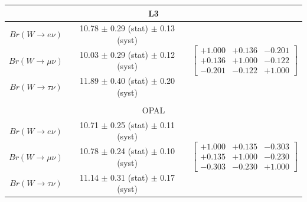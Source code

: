 \begin{table}[ht]
{\begin{tabular}{ |c| c  c | }
         
         \hline
         \multicolumn{3}{|c|}{L3 \cite{Achard:2004zw}} \\
         \hline
         $Br(W\to e    \nu)$    & 10.78 $\pm$ 0.29 (stat) $\pm$ 0.13 (syst) & 
         \multirow{3}{*}{
            \begin{footnotesize}
            $\begin{bmatrix}
                +1.000 &+0.136 &-0.201 \\ 
                +0.136 &+1.000 &-0.122 \\
                -0.201 &-0.122 &+1.000 
            \end{bmatrix}$ 
            \end{footnotesize} 
         } \\
         $Br(W\to \mu  \nu)$    & 10.03 $\pm$ 0.29 (stat) $\pm$ 0.12 (syst) & \\ 
         $Br(W\to \tau \nu)$    & 11.89 $\pm$ 0.40 (stat) $\pm$ 0.20 (syst) & \\
         \hline
         
         \multicolumn{3}{c}{} \\
         
         \hline
         \multicolumn{3}{|c|}{OPAL \cite{Abbiendi:2007rs}} \\
         \hline
         $Br(W\to e    \nu)$    & 10.71 $\pm$ 0.25 (stat) $\pm$ 0.11 (syst) & 
         \multirow{3}{*}{
            \begin{footnotesize}
            $\begin{bmatrix}
                +1.000 &+0.135 &-0.303 \\ 
                +0.135 &+1.000 &-0.230 \\
                -0.303 &-0.230 &+1.000 
            \end{bmatrix}$ 
            \end{footnotesize} 
         } \\
         $Br(W\to \mu  \nu)$    & 10.78 $\pm$ 0.24 (stat) $\pm$ 0.10 (syst) & \\ 
         $Br(W\to \tau \nu)$    & 11.14 $\pm$ 0.31 (stat) $\pm$ 0.17 (syst) & \\
         \hline
         

\end{tabular}}
\end{table}
